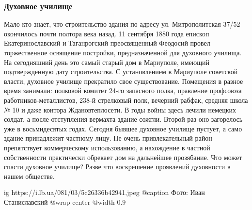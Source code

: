  
 
 
 
 

\subsubsection{Духовное училище}

Мало кто знает, что строительство здания по адресу ул. Митрополитская 37/52
окончилось почти полтора века назад. 11 сентября 1880 года епископ
Екатеринославский и Таганрогский преосвященный Феодосий провел торжественное
освящение постройки, предназначенной для духовного училища. На сегодняшний день
это самый старый дом в Мариуполе, имеющий подтвержденную дату строительства. С
установлением в Мариуполе советской власти, духовное училище прекратило свое
существование. Помещения в разное время занимали: полковой комитет 24-го
запасного полка, правление профсоюза работников-металлистов, 238-й стрелковый
полк, вечерний рабфак, средняя школа № 10 и даже контора Ждановтеплосети. В
годы войны здесь лечили немецких солдат, а после отступления вермахта здание
сожгли. Второй раз оно загорелось уже в восьмидесятых годах. Сегодня бывшее
духовное училище пустует, а само здание принадлежит частному лицу. Не очень
привлекательный район препятствует коммерческому использованию, а нахождение в
частной собственности практически обрекает дом на дальнейшее прозябание. Что
может спасти духовное училище? Разве что воскрешение проявлений духовности в
нашем обществе.

\ifcmt
  ig https://i.lb.ua/081/03/5c26336b42941.jpeg
	@caption Фото: Иван Станиславский
  @wrap center
  @width 0.9
\fi
